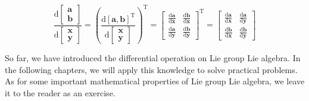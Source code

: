 \begin{equation}
\frac{\mathrm{\mathrm{d}}\begin{bmatrix}
	\bm{a}\\
	\bm{b}
	\end{bmatrix}}{{\mathrm{d} \begin{bmatrix}
		\bm{x}\\
		\bm{y}
		\end{bmatrix}}} = {\left( \frac{\mathrm{d}[\bm{a},\bm{b}]^\mathrm{T}}{{\mathrm{d}\begin{bmatrix}
			\bm{x}\\
			\bm{y}
			\end{bmatrix}}} \right)^\mathrm{T}} = {{\begin{bmatrix}
		{\frac{{\mathrm{d}\bm{a}}}{{\mathrm{d}\bm{x}}}}&{\frac{{\mathrm{d}\bm{b}}}{{\mathrm{d}\bm{x}}}}\\
		{\frac{{\mathrm{d}\bm{a}}}{{\mathrm{d}\bm{y}}}}&{\frac{{\mathrm{d}\bm{b}}}{{\mathrm{d}\bm{y}}}}
		\end{bmatrix}} ^\mathrm{T}} = {\begin{bmatrix}
	{\frac{{\mathrm{d}\bm{a}}}{{\mathrm{d}\bm{x}}}}&{\frac{{\mathrm{d}\bm{a}}}{{\mathrm{d}\bm{y}}}}\\
	{\frac{{\mathrm{d}\bm{b}}}{{\mathrm{d}\bm{x}}}}&{\frac{{\mathrm{d}\bm{b}}}{{\mathrm{d}\bm{y}}}}
	\end{bmatrix}}
\end{equation}

So far, we have introduced the differential operation on Lie group Lie algebra. In the following chapters, we will apply this knowledge to solve practical problems. As for some important mathematical properties of Lie group Lie algebra, we leave it to the reader as an exercise.